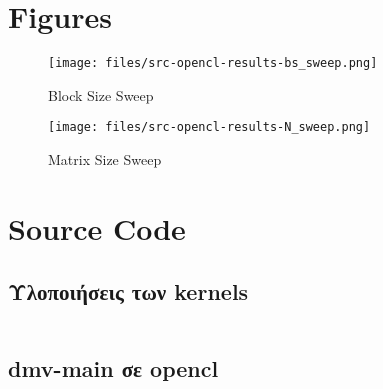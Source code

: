 \section{Figures}

\begin{figure}[H]
    \centering
    \texttt{[image: files/src-opencl-results-bs\_sweep.png]}
    \caption{Block Size Sweep}
    \label{fig:bs_sweep}
\end{figure}
\begin{figure}[H]
    \centering
    \texttt{[image: files/src-opencl-results-N\_sweep.png]}
    \caption{Matrix Size Sweep}
    \label{fig:n_sweep}
\end{figure}

\pagebreak 

\section{Source Code}
\subsection{Υλοποιήσεις των kernels}
\inputminted[linenos,fontsize=\scriptsize,frame=leftline]{c}{files/src-opencl-dmv_kernels.cl}

\subsection{dmv-main σε opencl}

\inputminted[linenos,fontsize=\scriptsize,frame=leftline]{c}{files/src-opencl-dmv_main.c}




